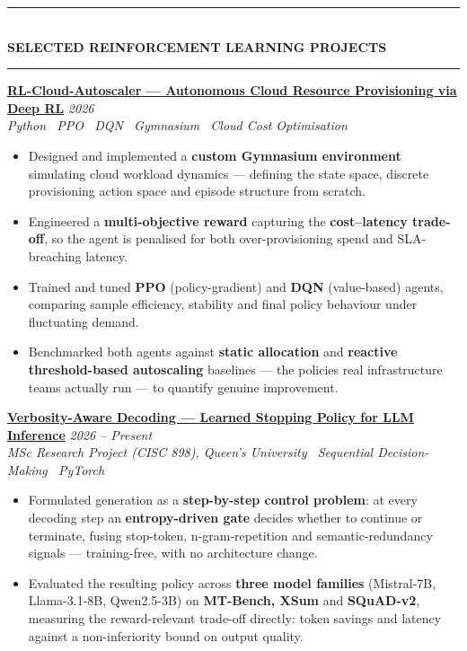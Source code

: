 \documentclass[10pt, a4paper]{article}
\newcommand{\cvsection}[1]{%
  \vspace{3pt}%
  {\color{navy}\rule{\linewidth}{1.1pt}}\\[0.5pt]%
  {\color{navy}\bfseries\fontsize{9.5}{11}\selectfont\uppercase{#1}}\\[-4pt]%
  {\color{teal}\rule{\linewidth}{0.6pt}}%
  \vspace{2pt}%
}
\newcommand{\cvproject}[3]{%
  \vspace{2.5pt}%
  {\bfseries\color{navy}#1} \hfill {\color{midgray}\textit{#3}}\\[-1.5pt]%
  {\color{teal}\textit{#2}}%
}
\newenvironment{cvitems}{%
  \begin{itemize}[leftmargin=11pt, itemsep=0.5pt, parsep=0pt, topsep=1pt,
                  label={\textcolor{teal}{$\bullet$}}]
}{%
  \end{itemize}%
}
\begin{document}
\cvsection{Selected Reinforcement Learning Projects}

\cvproject{\href{https://github.com/MahmoudAlyosify/RL-Cloud-Autoscaler}{RL-Cloud-Autoscaler --- Autonomous Cloud Resource Provisioning via Deep RL}}
          {Python \textperiodcentered\ PPO \textperiodcentered\ DQN \textperiodcentered\ Gymnasium \textperiodcentered\ Cloud Cost Optimisation}
          {2026}
\begin{cvitems}
  \item Designed and implemented a \textbf{custom Gymnasium environment} simulating cloud workload dynamics --- defining the state space, discrete provisioning action space and episode structure from scratch.
  \item Engineered a \textbf{multi-objective reward} capturing the \textbf{cost--latency trade-off}, so the agent is penalised for both over-provisioning spend and SLA-breaching latency.
  \item Trained and tuned \textbf{PPO} (policy-gradient) and \textbf{DQN} (value-based) agents, comparing sample efficiency, stability and final policy behaviour under fluctuating demand.
  \item Benchmarked both agents against \textbf{static allocation} and \textbf{reactive threshold-based autoscaling} baselines --- the policies real infrastructure teams actually run --- to quantify genuine improvement.
\end{cvitems}

\cvproject{\href{https://github.com/MahmoudAlyosify/minimal-lm}{Verbosity-Aware Decoding --- Learned Stopping Policy for LLM Inference}}
          {MSc Research Project (CISC 898), Queen's University \textperiodcentered\ Sequential Decision-Making \textperiodcentered\ PyTorch}
          {2026 -- Present}
\begin{cvitems}
  \item Formulated generation as a \textbf{step-by-step control problem}: at every decoding step an \textbf{entropy-driven gate} decides whether to continue or terminate, fusing stop-token, n-gram-repetition and semantic-redundancy signals --- training-free, with no architecture change.
  \item Evaluated the resulting policy across \textbf{three model families} (Mistral-7B, Llama-3.1-8B, Qwen2.5-3B) on \textbf{MT-Bench, XSum} and \textbf{SQuAD-v2}, measuring the reward-relevant trade-off directly: token savings and latency against a non-inferiority bound on output quality.
\end{cvitems}
\end{document}
